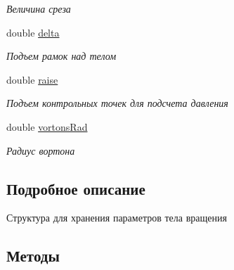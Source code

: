 \begin{DoxyCompactItemize}
\begin{DoxyCompactList}\small\item\em Величина среза \end{DoxyCompactList}\item 
\mbox{\label{struct_rotation_body_parameters_a1d72d0ec82dc00ce8591bb7f00309a28}} 
double \mbox{\hyperlink{struct_rotation_body_parameters_a1d72d0ec82dc00ce8591bb7f00309a28}{delta}}
\begin{DoxyCompactList}\small\item\em Подъем рамок над телом \end{DoxyCompactList}\item 
\mbox{\label{struct_rotation_body_parameters_a1a8c15e4f598f3c1df4bd8a703e6d35d}} 
double \mbox{\hyperlink{struct_rotation_body_parameters_a1a8c15e4f598f3c1df4bd8a703e6d35d}{raise}}
\begin{DoxyCompactList}\small\item\em Подъем контрольных точек для подсчета давления \end{DoxyCompactList}\item 
\mbox{\label{struct_rotation_body_parameters_a2dd755dc9bd17a5d70f1b508809f5bec}} 
double \mbox{\hyperlink{struct_rotation_body_parameters_a2dd755dc9bd17a5d70f1b508809f5bec}{vortons\+Rad}}
\begin{DoxyCompactList}\small\item\em Радиус вортона \end{DoxyCompactList}\end{DoxyCompactItemize}


\subsection{Подробное описание}
Структура для хранения параметров тела вращения 

\subsection{Методы}
\mbox{\label{struct_rotation_body_parameters_a0e0a77e37999193d1605464f2fee3b5c}} 
